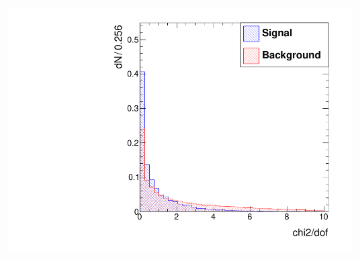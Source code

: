 \documentclass[10pt,a4paper]{article}
\begin{document}
\begin{figure}
\begin{subfigure}[b]{0.2\textwidth}
                \label{fig:fls3dBarrel}
        \end{subfigure}
        ~
        \begin{subfigure}[b]{0.2\textwidth}
                \centering
                \includegraphics[width=\textwidth]{Figures/chi2dof_barrel}
                \label{fig:chi2dofBarrel}
        \end{subfigure}
        

\end{figure}
\end{document}
